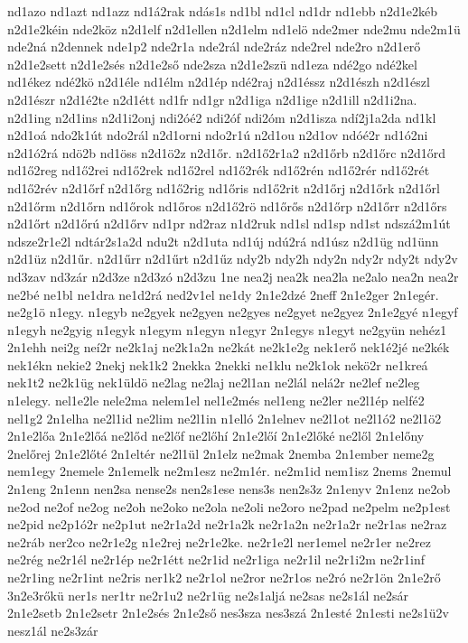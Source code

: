 {nd1azo
nd1azt
nd1azz
nd1á2rak
ndás1s
nd1bl
nd1cl
nd1dr
nd1ebb
n2d1e2kéb
n2d1e2kéin
nde2köz
n2d1elf
n2d1ellen
n2d1elm
nd1elö
nde2mer
nde2mu
nde2m1ü
nde2ná
n2dennek
nde1p2
nde2r1a
nde2rál
nde2ráz
nde2rel
nde2ro
n2d1erő
n2d1e2sett
n2d1e2sés
n2d1e2ső
nde2sza
n2d1e2szü
nd1eza
ndé2go
ndé2kel
nd1ékez
ndé2kö
n2d1éle
nd1élm
n2d1ép
ndé2raj
n2d1éssz
n2d1észh
n2d1észl
n2d1észr
n2d1é2te
n2d1étt
nd1fr
nd1gr
n2d1iga
n2d1ige
n2d1ill
n2d1i2na.
n2d1ing
n2d1ins
n2d1i2onj
ndi2óé2
ndi2óf
ndi2óm
n2d1isza
ndí2j1a2da
nd1kl
n2d1oá
ndo2k1út
ndo2rál
n2d1orni
ndo2r1ú
n2d1ou
n2d1ov
ndóé2r
nd1ó2ni
n2d1ó2rá
ndö2b
nd1öss
n2d1ö2z
n2d1őr.
n2d1ő2r1a2
n2d1őrb
n2d1őrc
n2d1őrd
nd1ő2reg
nd1ő2rei
nd1ő2rek
nd1ő2rel
nd1ő2rék
nd1ő2rén
nd1ő2rér
nd1ő2rét
nd1ő2rév
n2d1őrf
n2d1őrg
nd1ő2rig
nd1őris
nd1ő2rit
n2d1őrj
n2d1őrk
n2d1őrl
n2d1őrm
n2d1őrn
nd1őrok
nd1őros
n2d1ő2rö
nd1őrős
n2d1őrp
n2d1őrr
n2d1őrs
n2d1őrt
n2d1őrú
n2d1őrv
nd1pr
nd2raz
n1d2ruk
nd1sl
nd1sp
nd1st
ndszá2m1út
ndsze2r1e2l
ndtár2s1a2d
ndu2t
n2d1uta
nd1új
ndú2rá
nd1úsz
n2d1üg
nd1ünn
n2d1üz
n2d1űr.
n2d1űrr
n2d1űrt
n2d1űz
ndy2b
ndy2h
ndy2n
ndy2r
ndy2t
ndy2v
nd3zav
nd3zár
n2d3ze
n2d3zó
n2d3zu
1ne
nea2j
nea2k
nea2la
ne2alo
nea2n
nea2r
ne2bé
ne1bl
ne1dra
ne1d2rá
ned2v1el
ne1dy
2n1e2dzé
2neff
2n1e2ger
2n1egér.
ne2g1ö
n1egy.
n1egyb
ne2gyek
ne2gyen
ne2gyes
ne2gyet
ne2gyez
2n1e2gyé
n1egyf
n1egyh
ne2gyig
n1egyk
n1egym
n1egyn
n1egyr
2n1egys
n1egyt
ne2gyün
nehéz1
2n1ehh
nei2g
neí2r
ne2k1aj
ne2k1a2n
ne2kát
ne2k1e2g
nek1erő
nek1é2jé
ne2kék
nek1ékn
nekie2
2nekj
nek1k2
2nekka
2nekki
ne1klu
ne2k1ok
nekö2r
ne1kreá
nek1t2
ne2k1üg
nek1üldö
ne2lag
ne2laj
ne2l1an
ne2lál
nelá2r
ne2lef
ne2leg
n1elegy.
nel1e2le
nele2ma
nelem1el
nel1e2més
nel1eng
ne2ler
ne2l1ép
nelfé2
nel1g2
2n1elha
ne2l1id
ne2lim
ne2l1in
n1elló
2n1elnev
ne2l1ot
ne2l1ó2
ne2l1ö2
2n1e2lőa
2n1e2lőá
ne2lőd
ne2lőf
ne2lőhí
2n1e2lőí
2n1e2lőké
ne2lől
2n1előny
2nelőrej
2n1e2lőté
2n1eltér
ne2l1ül
2n1elz
ne2mak
2nemba
2n1ember
neme2g
nem1egy
2nemele
2n1emelk
ne2m1esz
ne2m1ér.
ne2m1id
nem1isz
2nems
2nemul
2n1eng
2n1enn
nen2sa
nense2s
nen2s1ese
nens3s
nen2s3z
2n1enyv
2n1enz
ne2ob
ne2od
ne2of
ne2og
ne2oh
ne2oko
ne2ola
ne2oli
ne2oro
ne2pad
ne2pelm
ne2p1est
ne2pid
ne2p1ó2r
ne2p1ut
ne2r1a2d
ne2r1a2k
ne2r1a2n
ne2r1a2r
ne2r1as
ne2raz
ne2ráb
ner2co
ne2r1e2g
n1e2rej
ne2r1e2ke.
ne2r1e2l
ner1emel
ne2r1er
ne2rez
ne2rég
ne2r1él
ne2r1ép
ne2r1étt
ne2r1id
ne2r1iga
ne2r1il
ne2r1i2m
ne2r1inf
ne2r1ing
ne2r1int
ne2ris
ner1k2
ne2r1ol
ne2ror
ne2r1os
ne2ró
ne2r1ön
2n1e2rő
3n2e3rőkü
ner1s
ner1tr
ne2r1u2
ne2r1üg
ne2s1aljá
ne2sas
ne2s1ál
ne2sár
2n1e2setb
2n1e2setr
2n1e2sés
2n1e2ső
nes3sza
nes3szá
2n1esté
2n1esti
ne2s1ü2v
nesz1ál
ne2s3zár
}

